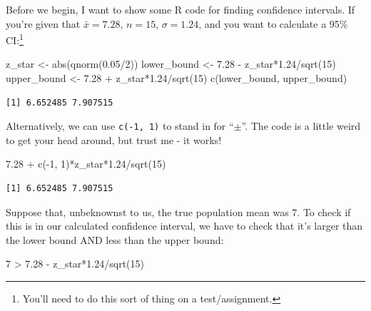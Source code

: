 \documentclass[
  letterpaper,
  DIV=11,
  numbers=noendperiod,
  oneside]{scrreprt}
\newenvironment{Shaded}{\begin{snugshade}}{\end{snugshade}}
\newcommand{\DecValTok}[1]{\textcolor[rgb]{0.68,0.00,0.00}{#1}}
\newcommand{\FloatTok}[1]{\textcolor[rgb]{0.68,0.00,0.00}{#1}}
\newcommand{\FunctionTok}[1]{\textcolor[rgb]{0.28,0.35,0.67}{#1}}
\newcommand{\NormalTok}[1]{\textcolor[rgb]{0.00,0.23,0.31}{#1}}
\newcommand{\OtherTok}[1]{\textcolor[rgb]{0.00,0.23,0.31}{#1}}
\newcommand{\SpecialCharTok}[1]{\textcolor[rgb]{0.37,0.37,0.37}{#1}}
\begin{document}
Before we begin, I want to show some R code for finding confidence
intervals. If you're given that \(\bar x = 7.28\), \(n=15\),
\(\sigma = 1.24\), and you want to calculate a 95\% CI:\footnote{You'll
  need to do this sort of thing on a test/assignment.}

\begin{Shaded}
\begin{Highlighting}[]
\NormalTok{z\_star }\OtherTok{\textless{}{-}} \FunctionTok{abs}\NormalTok{(}\FunctionTok{qnorm}\NormalTok{(}\FloatTok{0.05}\SpecialCharTok{/}\DecValTok{2}\NormalTok{))}
\NormalTok{lower\_bound }\OtherTok{\textless{}{-}} \FloatTok{7.28} \SpecialCharTok{{-}}\NormalTok{ z\_star}\SpecialCharTok{*}\FloatTok{1.24}\SpecialCharTok{/}\FunctionTok{sqrt}\NormalTok{(}\DecValTok{15}\NormalTok{)}
\NormalTok{upper\_bound }\OtherTok{\textless{}{-}} \FloatTok{7.28} \SpecialCharTok{+}\NormalTok{ z\_star}\SpecialCharTok{*}\FloatTok{1.24}\SpecialCharTok{/}\FunctionTok{sqrt}\NormalTok{(}\DecValTok{15}\NormalTok{)}
\FunctionTok{c}\NormalTok{(lower\_bound, upper\_bound)}
\end{Highlighting}
\end{Shaded}

\begin{verbatim}
[1] 6.652485 7.907515
\end{verbatim}

Alternatively, we can use \texttt{c(-1,\ 1)} to stand in for
``\(\pm\)''. The code is a little weird to get your head around, but
trust me - it works!

\begin{Shaded}
\begin{Highlighting}[]
\FloatTok{7.28} \SpecialCharTok{+} \FunctionTok{c}\NormalTok{(}\SpecialCharTok{{-}}\DecValTok{1}\NormalTok{, }\DecValTok{1}\NormalTok{)}\SpecialCharTok{*}\NormalTok{z\_star}\SpecialCharTok{*}\FloatTok{1.24}\SpecialCharTok{/}\FunctionTok{sqrt}\NormalTok{(}\DecValTok{15}\NormalTok{)}
\end{Highlighting}
\end{Shaded}

\begin{verbatim}
[1] 6.652485 7.907515
\end{verbatim}

Suppose that, unbeknownst to us, the true population mean was 7. To
check if this is in our calculated confidence interval, we have to check
that it's larger than the lower bound AND less than the upper bound:

\begin{Shaded}
\begin{Highlighting}[]
\DecValTok{7} \SpecialCharTok{\textgreater{}} \FloatTok{7.28} \SpecialCharTok{{-}}\NormalTok{ z\_star}\SpecialCharTok{*}\FloatTok{1.24}\SpecialCharTok{/}\FunctionTok{sqrt}\NormalTok{(}\DecValTok{15}\NormalTok{) }
\end{Highlighting}
\end{Shaded}
\end{document}
